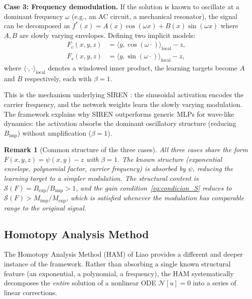 \documentclass[12pt]{article}
\newtheorem{remark}{Remark}
\begin{document}
\textbf{Case 3: Frequency demodulation.}
If the solution is known to oscillate at a dominant frequency
$\omega$ (e.g., an AC circuit, a mechanical resonator), the signal
can be decomposed as
$f^*(x) = A(x)\cos(\omega x) + B(x)\sin(\omega x)$
where $A, B$ are slowly varying envelopes.
Defining two implicit models:
\begin{align}
  F_c(x, y, z) &= \langle y, \cos(\omega \cdot)\rangle_{\mathrm{local}} - z, \\
  F_s(x, y, z) &= \langle y, \sin(\omega \cdot)\rangle_{\mathrm{local}} - z,
\end{align}
where $\langle\cdot,\cdot\rangle_{\mathrm{local}}$ denotes a
windowed inner product, the learning targets become $A$ and $B$
respectively, each with $\beta = 1$.

This is the mechanism underlying SIREN \cite{Sitzmann2020}:
the sinusoidal activation encodes the carrier frequency, and the
network weights learn the slowly varying modulation.
The framework explains why SIREN outperforms generic MLPs for
wave-like dynamics: the activation absorbs the dominant oscillatory
structure (reducing $B_{\mathrm{imp}}$) without amplification
($\beta = 1$).

\begin{remark}[Common structure of the three cases]
\label{rem:common_structure}
All three cases share the form $F(x,y,z) = \psi(x,y) - z$ with
$\beta = 1$.
The known structure (exponential envelope, polynomial factor, carrier
frequency) is absorbed by $\psi$, reducing the learning target to
a simpler modulation.
The structural content is $\mathcal{S}(F) = B_{\mathrm{exp}} /
B_{\mathrm{imp}} > 1$, and the gain condition~\eqref{eq:condicion_S}
reduces to $\mathcal{S}(F) > M_{\mathrm{imp}} / M_{\mathrm{exp}}$,
which is satisfied whenever the modulation has comparable range to
the original signal.
\end{remark}

\subsection{Homotopy Analysis Method}
\label{sec:ham}

The Homotopy Analysis Method (HAM) of Liao \cite{Liao2003, Liao2012}
provides a different and deeper instance of the framework.
Rather than absorbing a single known structural feature (an
exponential, a polynomial, a frequency), the HAM systematically
decomposes the \emph{entire} solution of a nonlinear ODE
$\mathcal{N}[u] = 0$ into a series of linear corrections.
\end{document}
